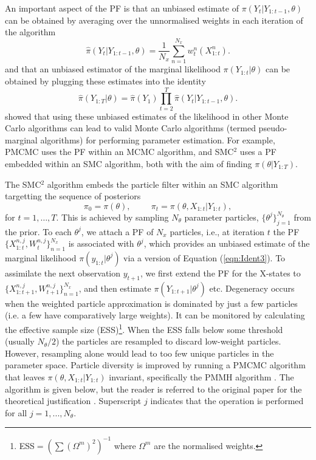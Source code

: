 \documentclass[a4paper,12pt]{article}
\begin{document}
An important aspect of the PF is that an unbiased estimate of $\pi (Y_t \vert Y_{1:t-1}, \theta)$ can be  obtained by averaging over the unnormalised weights in each iteration of the algorithm
\begin{equation}\label{eqn:Ident4}
\hat{\pi} (Y_t \vert Y_{1:t-1}, \theta) = \frac{1}{N_x} \sum_{n=1}^{N_x} w_t^n (X_{1:t}^n).
\end{equation}
and that an unbiased estimator of the marginal likelihood $\pi (Y_{1:t} \vert  \theta)$ can be obtained by plugging these estimates into the identity \cite{DelMoral2004}
\begin{equation}\label{eqn:Ident3}
\hat{\pi} (Y_{1:T} \vert \theta) = \hat{\pi}(Y_1) \prod_{t=2}^T \hat{\pi} (Y_t \vert Y_{1:t-1}, \theta).
\end{equation}
\cite{Andrieu2009} showed that using these unbiased estimates of the likelihood in other Monte Carlo algorithms can lead to valid Monte Carlo algorithms (termed pseudo-marginal algorithms) for performing parameter estimation. For example, PMCMC \cite{Andrieu2010} uses the PF within an MCMC algorithm, and SMC$^2$ \cite{Chopin2012} uses a PF embedded within an SMC algorithm, both with the aim of finding $\pi(\theta | Y_{1:T})$.


The SMC$^2$ algorithm \cite{Chopin2012} embeds the particle filter within an SMC algorithm targetting the sequence of posteriors
\begin{equation*}
\pi_0 = \pi(\theta), \hspace{1cm} \pi_t = \pi(\theta, X_{1:t} \vert Y_{1:t}),
\end{equation*}
for $t=1, \ldots, T$. 
This is achieved by sampling $N_\theta$ parameter particles, $\{\theta^j\}_{j=1}^{N_\theta}$ from the prior. To each $\theta^j$, we attach a PF of  $N_x$ particles, i.e., at iteration $t$ the PF $\{X_{1:t}^{n,j}, W_t^{n,j}\}_{n=1}^{N_x}$ is associated with $\theta^j$, which provides an unbiased estimate of the marginal likelihood $\pi(y_{1:t} |\theta^j)$ via a version of Equation (\ref{eqn:Ident3}). To assimilate the next observation $y_{t+1}$, we first extend the PF for the X-states to $\{X_{1:t+1}^{n,j}, W_{t+1}^{n,j}\}_{n=1}^{N_x}$, and then estimate $\pi(Y_{1:t+1} | \theta^j)$ etc. 
Degeneracy occurs when the weighted particle approximation is dominated by just  a few particles (i.e. a few have comparatively large weights).
It can be monitored by calculating the effective sample size (ESS)\footnote{ESS$ = \left( \sum  \left( \Omega^m \right)^2 \right)^{-1}$ where $\Omega^m$ are the normalised weights.}.
When the ESS falls below some threshold (usually $N_\theta / 2$) the particles are resampled to discard low-weight particles.
However, resampling alone would lead to too few unique particles in the parameter space.
Particle diversity is improved by running a PMCMC algorithm that leaves $\pi (\theta, X_{1:t} \vert Y_{1:t})$ invariant, specifically the PMMH algorithm \cite{Andrieu2010}.
The algorithm is given below, but the reader is referred to the original paper for the theoretical justification \cite{Chopin2012}.
Superscript $j$ indicates that the operation is performed for all $j = 1,...,N_{\theta}$.
\end{document}
